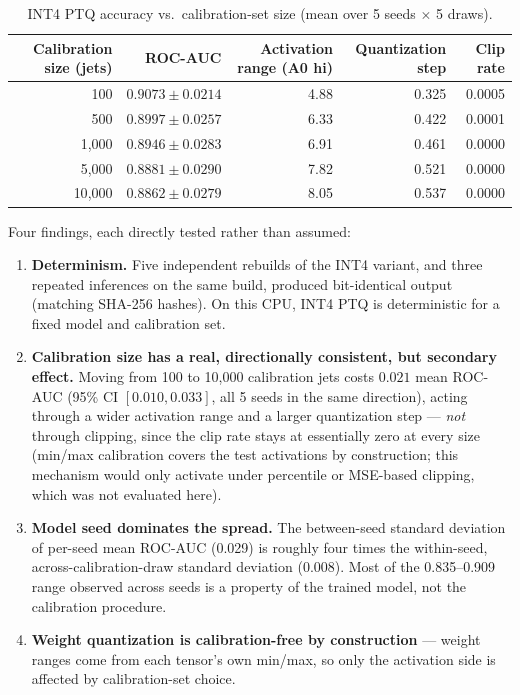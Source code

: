 \documentclass[11pt]{article}
\begin{document}
\begin{table}[h]
\centering
\caption{INT4 PTQ accuracy vs.\ calibration-set size (mean over 5 seeds $\times$ 5 draws).}
\label{tab:calib}
\small
\begin{tabular}{rrrrr}
\toprule
Calibration size (jets) & ROC-AUC & Activation range (A0 hi) & Quantization step & Clip rate \\
\midrule
100    & $0.9073 \pm 0.0214$ & 4.88 & 0.325 & 0.0005 \\
500    & $0.8997 \pm 0.0257$ & 6.33 & 0.422 & 0.0001 \\
1{,}000  & $0.8946 \pm 0.0283$ & 6.91 & 0.461 & 0.0000 \\
5{,}000  & $0.8881 \pm 0.0290$ & 7.82 & 0.521 & 0.0000 \\
10{,}000 & $0.8862 \pm 0.0279$ & 8.05 & 0.537 & 0.0000 \\
\bottomrule
\end{tabular}
\end{table}

Four findings, each directly tested rather than assumed:
\begin{enumerate}
  \item \textbf{Determinism.} Five independent rebuilds of the INT4 variant, and three repeated
    inferences on the same build, produced bit-identical output (matching SHA-256 hashes). On this CPU,
    INT4 PTQ is deterministic for a fixed model and calibration set.
  \item \textbf{Calibration size has a real, directionally consistent, but secondary effect.} Moving
    from 100 to 10{,}000 calibration jets costs $0.021$ mean ROC-AUC (95\% CI $[0.010, 0.033]$, all 5
    seeds in the same direction), acting through a wider activation range and a larger quantization
    step --- \emph{not} through clipping, since the clip rate stays at essentially zero at every size
    (min/max calibration covers the test activations by construction; this mechanism would only
    activate under percentile or MSE-based clipping, which was not evaluated here).
  \item \textbf{Model seed dominates the spread.} The between-seed standard deviation of per-seed mean
    ROC-AUC (0.029) is roughly four times the within-seed, across-calibration-draw standard deviation
    (0.008). Most of the 0.835--0.909 range observed across seeds is a property of the trained model,
    not the calibration procedure.
  \item \textbf{Weight quantization is calibration-free by construction} --- weight ranges come from
    each tensor's own min/max, so only the activation side is affected by calibration-set choice.
\end{enumerate}
\end{document}
